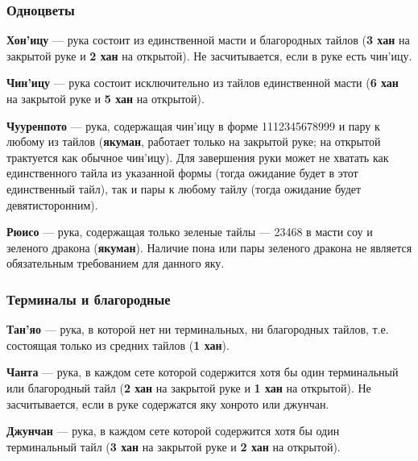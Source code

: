  \hfill {}

\subsubsection{Одноцветы}

\textbf{Хон'ицу} --- рука состоит из единственной масти и благородных тайлов (\textbf{3 хан} на закрытой руке и \textbf{2 хан} на открытой). Не засчитывается, если в руке есть чин'ицу.

 \hfill {}

\textbf{Чин'ицу} --- рука состоит исключительно из тайлов единственной масти (\textbf{6 хан} на закрытой руке и \textbf{5 хан} на открытой).

\textbf{Чууренпото} --- рука, содержащая чин'ицу в форме 1112345678999 и пару к любому из тайлов (\textbf{якуман}, работает только на закрытой руке; на открытой трактуется как обычное чин'ицу). Для завершения руки может не хватать как единственного тайла из указанной формы (тогда ожидание будет в этот единственный тайл), так и пары к любому тайлу (тогда ожидание будет девятисторонним).


\textbf{Рюисо} --- рука, содержащая только зеленые тайлы --- 23468 в масти соу и зеленого дракона (\textbf{якуман}). Наличие пона или пары зеленого дракона не является обязательным требованием для данного яку.

 \hfill {}

\subsubsection{Терминалы и благородные}

\textbf{Тан'яо} --- рука, в которой нет ни терминальных, ни благородных тайлов, т.е. состоящая только из средних тайлов (\textbf{1 хан}).

 \hfill {}

\textbf{Чанта} --- рука, в каждом сете которой содержится хотя бы один терминальный или благородный тайл (\textbf{2 хан} на закрытой руке и \textbf{1 хан} на открытой). Не засчитывается, если в руке содержатся яку хонрото или джунчан.

 \hfill {}

\textbf{Джунчан} --- рука, в каждом сете которой содержится хотя бы один терминальный тайл (\textbf{3 хан} на закрытой руке и \textbf{2 хан} на открытой).

